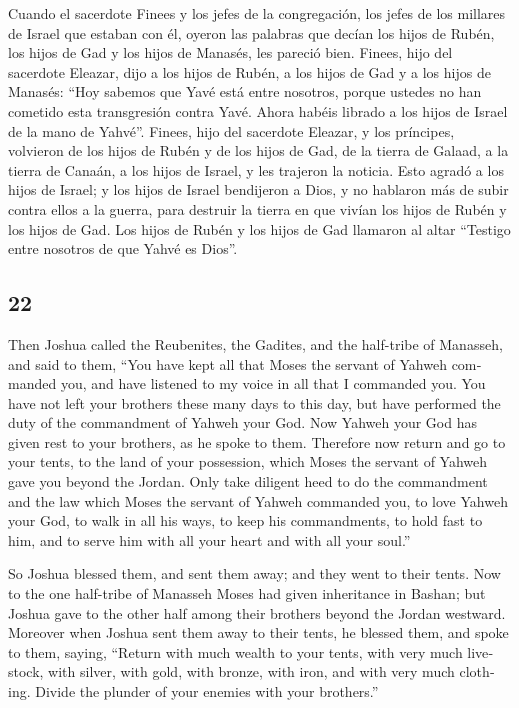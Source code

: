 \begin{paracol}{2}
 Cuando el sacerdote Finees y los jefes de la
congregación, los jefes de los millares de Israel que estaban con él,
oyeron las palabras que decían los hijos de Rubén, los hijos de Gad y
los hijos de Manasés, les pareció bien.  Finees, hijo del
sacerdote Eleazar, dijo a los hijos de Rubén, a los hijos de Gad y a los
hijos de Manasés: ``Hoy sabemos que Yavé está entre nosotros, porque
ustedes no han cometido esta transgresión contra Yavé. Ahora habéis
librado a los hijos de Israel de la mano de Yahvé''. 
Finees, hijo del sacerdote Eleazar, y los príncipes, volvieron de los
hijos de Rubén y de los hijos de Gad, de la tierra de Galaad, a la
tierra de Canaán, a los hijos de Israel, y les trajeron la noticia.
 Esto agradó a los hijos de Israel; y los hijos de Israel
bendijeron a Dios, y no hablaron más de subir contra ellos a la guerra,
para destruir la tierra en que vivían los hijos de Rubén y los hijos de
Gad.  Los hijos de Rubén y los hijos de Gad llamaron al
altar ``Testigo entre nosotros de que Yahvé es Dios''.

\switchcolumn
\begin{otherlanguage}{english}

\hypertarget{section-43}{%
\section{22}\label{section-43}}

 Then Joshua called the Reubenites, the Gadites, and the
half-tribe of Manasseh,  and said to them, ``You have kept
all that Moses the servant of Yahweh commanded you, and have listened to
my voice in all that I commanded you.  You have not left
your brothers these many days to this day, but have performed the duty
of the commandment of Yahweh your God.  Now Yahweh your
God has given rest to your brothers, as he spoke to them. Therefore now
return and go to your tents, to the land of your possession, which Moses
the servant of Yahweh gave you beyond the Jordan.  Only
take diligent heed to do the commandment and the law which Moses the
servant of Yahweh commanded you, to love Yahweh your God, to walk in all
his ways, to keep his commandments, to hold fast to him, and to serve
him with all your heart and with all your soul.''

 So Joshua blessed them, and sent them away; and they went
to their tents.  Now to the one half-tribe of Manasseh
Moses had given inheritance in Bashan; but Joshua gave to the other half
among their brothers beyond the Jordan westward. Moreover when Joshua
sent them away to their tents, he blessed them,  and spoke
to them, saying, ``Return with much wealth to your tents, with very much
livestock, with silver, with gold, with bronze, with iron, and with very
much clothing. Divide the plunder of your enemies with your brothers.''


\end{otherlanguage}
\end{paracol}
